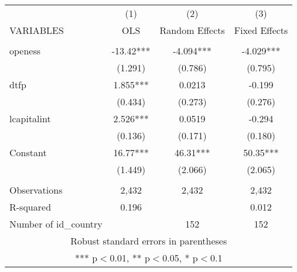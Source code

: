 

{
\begin{tabular}{lccc} \hline
 & (1) & (2) & (3) \\
VARIABLES & OLS & Random Effects & Fixed Effects \\ \hline
 &  &  &  \\
openess & -13.42*** & -4.094*** & -4.029*** \\
 & (1.291) & (0.786) & (0.795) \\
dtfp & 1.855*** & 0.0213 & -0.199 \\
 & (0.434) & (0.273) & (0.276) \\
lcapitalint & 2.526*** & 0.0519 & -0.294 \\
 & (0.136) & (0.171) & (0.180) \\
Constant & 16.77*** & 46.31*** & 50.35*** \\
 & (1.449) & (2.066) & (2.065) \\
 &  &  &  \\
Observations & 2,432 & 2,432 & 2,432 \\
R-squared & 0.196 &  & 0.012 \\
 Number of id\_country &  & 152 & 152 \\ \hline
\multicolumn{4}{c}{ Robust standard errors in parentheses} \\
\multicolumn{4}{c}{ *** p$<$0.01, ** p$<$0.05, * p$<$0.1} \\
\end{tabular}
}
